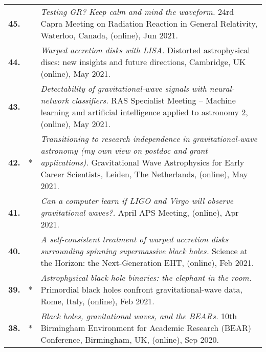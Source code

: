 {\begin{longtable}{rp{0.3cm}p{15.8cm}}
%
\textbf{45.} &  & \textit{Testing GR? Keep calm and mind the waveform.}
\newline{}
24rd Capra Meeting on Radiation Reaction in General Relativity, Waterloo, Canada, (online), Jun 2021.
\vspace{0.05cm}\\
%
\textbf{44.} &  & \textit{Warped accretion disks with LISA.}
\newline{}
Distorted astrophysical discs: new insights and future directions, Cambridge, UK (online), May 2021.
\vspace{0.05cm}\\
%
\textbf{43.} &  & \textit{Detectability of gravitational-wave signals with neural-network classifiers.}
\newline{}
RAS Specialist Meeting -- Machine learning and artificial intelligence applied to astronomy 2, (online), May 2021.
\vspace{0.05cm}\\
%
\textbf{42.} & * & \textit{Transitioning to research independence in gravitational-wave astronomy (my own view on postdoc and grant applications).}
\newline{}
Gravitational Wave Astrophysics for Early Career Scientists, Leiden, The Netherlands, (online), May 2021.
\vspace{0.05cm}\\
%
\textbf{41.} &  & \textit{Can a computer learn if LIGO and Virgo will observe gravitational waves?.}
\newline{}
April APS Meeting, (online), Apr 2021.
\vspace{0.05cm}\\
%
\textbf{40.} &  & \textit{A self-consistent treatment of warped accretion disks surrounding spinning supermassive black holes.}
\newline{}
Science at the Horizon: the Next-Generation EHT, (online), Feb 2021.
\vspace{0.05cm}\\
%
\textbf{39.} & * & \textit{Astrophysical black-hole binaries: the elephant in the room.}
\newline{}
Primordial black holes confront gravitational-wave data, Rome, Italy, (online), Feb 2021.
\vspace{0.05cm}\\
%
\textbf{38.} & * & \textit{Black holes, gravitational waves, and the BEARs.}
\newline{}
10th Birmingham Environment for Academic Research (BEAR) Conference, Birmingham, UK, (online), Sep 2020.

\end{longtable}}
